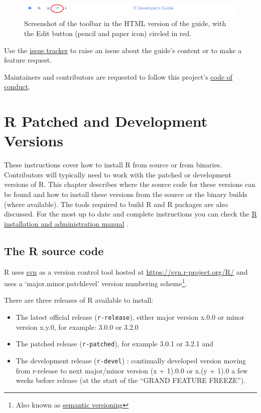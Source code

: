 \documentclass[
]{book}
\begin{document}
\begin{figure}
\centering
\includegraphics{img/edit_icon.png}
\caption{Screenshot of the toolbar in the HTML version of the guide, with the Edit button (pencil and paper icon) circled in red.}
\end{figure}

Use the \href{https://github.com/r-devel/rdevguide/issues}{issue tracker} to raise an issue about the guide's content or to make a feature request.

Maintainers and contributors are requested to follow this project's \href{https://github.com/r-devel/rdevguide/blob/main/CONDUCT.md}{code of conduct}.

\chapter{R Patched and Development Versions}\label{GetStart}

These instructions cover how to install R from source or from binaries.
Contributors will typically need to work with the patched or development versions of R.
This chapter describes where the source code for these versions can be found and how to install these versions from the source or the binary builds (where available).
The tools required to build R and R packages are also discussed.
For the most up to date and complete instructions you can check the \href{https://cran.r-project.org/doc/manuals/r-devel/R-admin.html}{R installation and administration manual} .

\section{The R source code}\label{the-r-source-code}

R uses \href{https://subversion.apache.org/}{svn} as a version control tool hosted at \url{https://svn.r-project.org/R/} and uses a `major.minor.patchlevel' version numbering scheme\footnote{Also known as \href{https://en.wikipedia.org/wiki/Software_versioning\#Semantic_versioning}{semantic versioning}}.

There are three releases of R available to install:

\begin{itemize}
\item
  The latest official release (\texttt{r-release}), either major version x.0.0 or minor version x.y.0, for example: 3.0.0 or 3.2.0
\item
  The patched release (\texttt{r-patched}), for example 3.0.1 or 3.2.1 and
\item
  The development release (\texttt{r-devel}) : continually developed version moving from r-release to next major/minor version (x + 1).0.0 or x.(y + 1).0 a few weeks before release (at the start of the ``GRAND FEATURE FREEZE'').
\end{itemize}
\end{document}
